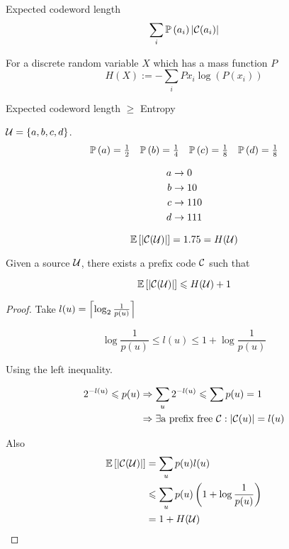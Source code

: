 \begin{definition}
    Expected codeword length
    \[
        \sum\limits_i \mathbb{P}\left( a_i \right) \left\lvert \mathcal{C}(a_i) \right\rvert
    \]
\end{definition}


\begin{definition}[Entropy]
    For a discrete random variable $X$ which has a mass function $P$
    \[
        H(X) := -\sum\limits_i P{x_i}\log(P(x_i))
    \]
\end{definition}

\begin{theorem}
   Expected codeword length $\geqslant$ Entropy
\end{theorem}

\begin{example}
    $\mathcal{U} = \left\{ a,b,c,d \right\}$.
    \[
        \begin{array}{cccc}
            \mathbb{P}\left( a \right) = \frac{1}{2} &
            \mathbb{P}\left( b \right) = \frac{1}{4} &
            \mathbb{P}\left( c \right) = \frac{1}{8} &
            \mathbb{P}\left( d \right) = \frac{1}{8}
        \end{array}
    \]
    
    \[
        \begin{aligned}
            a &\rightarrow 0\\
            b &\rightarrow 10\\
            c &\rightarrow 110\\
            d &\rightarrow 111
        \end{aligned}
    \]
    
    \[
        \mathbb{E}\left[ \left\lvert \mathcal{C}(\mathcal{U}) \right\rvert \right] = 1.75 = H(\mathcal{U})
    \]
\end{example}

\begin{theorem}
    Given a source $\mathcal{U}$, there exists a prefix code $\mathcal{C}$ such that
    
    \[
        \mathbb{E}\left[ \left\lvert \mathcal{C}(\mathcal{U}) \right\rvert \right]\leqslant H(\mathcal{U}) + 1
    \]
\end{theorem}
\begin{proof}
    Take $l(u) = \left\lceil \log_2\frac{1}{p(u)} \right\rceil$

    \[
        \log \frac{1}{p(u)} \leqslant l(u) \leqslant 1 + \log \frac{1}{p(u)}
    \]
    
    Using the left inequality.
    
    \[
        \begin{aligned}
            2^{-l(u)} \leqslant p(u) &\Rightarrow \sum\limits_u 2^{-l(u)} \leqslant \sum\limits p(u) = 1\\
            &\Rightarrow \exists \text{a prefix free }\mathcal{C}:\left\lvert \mathcal{C}(u)\right\rvert = l(u)
        \end{aligned}            
    \]    
    
    
    Also
    \[
        \begin{aligned}
            \mathbb{E}\left[ \left\lvert \mathcal{C}(\mathcal{U}) \right\rvert \right] &= \sum\limits_u p(u)l(u)\\
            &\leqslant \sum\limits_u p(u) \left( 1+\log\frac{1}{p(u)}\right)\\
            &=1+H(\mathcal{U})
        \end{aligned}
    \]
\end{proof}


